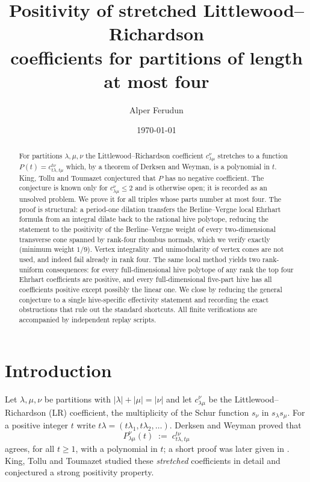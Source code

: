\documentclass[11pt]{amsart}
\title{Positivity of stretched Littlewood--Richardson\\ coefficients for partitions of length at most four}
\author{Alper Ferudun}
\date{\today}
\theoremstyle{definition}
\newcommand{\lam}{\lambda}
\begin{document}
\begin{abstract}
For partitions $\lam,\mu,\nu$ the Littlewood--Richardson coefficient
$c^{\nu}_{\lam\mu}$ stretches to a function $P(t)=c^{t\nu}_{t\lam,t\mu}$ which,
by a theorem of Derksen and Weyman, is a polynomial in $t$. King, Tollu and
Toumazet conjectured that $P$ has no negative coefficient. The conjecture is
known only for $c^{\nu}_{\lam\mu}\le 2$ and is otherwise open; it is recorded
as an unsolved problem. We prove it for all triples whose parts number at most
four. The proof is structural: a period-one dilation transfers the
Berline--Vergne local Ehrhart formula from an integral dilate back to the
rational hive polytope, reducing the statement to the positivity of the
Berline--Vergne weight of every two-dimensional transverse cone spanned by
rank-four rhombus normals, which we verify exactly (minimum weight $1/9$).
Vertex integrality and unimodularity of vertex cones are not used, and indeed
fail already in rank four. The same local method yields two rank-uniform
consequences: for every full-dimensional hive polytope of any rank the top four
Ehrhart coefficients are positive, and every full-dimensional five-part hive has
all coefficients positive except possibly the linear one. We close by reducing
the general conjecture to a single hive-specific effectivity statement and
recording the exact obstructions that rule out the standard shortcuts. All
finite verifications are accompanied by independent replay scripts.
\end{abstract}

\maketitle

\section{Introduction}

Let $\lam,\mu,\nu$ be partitions with $|\lam|+|\mu|=|\nu|$ and let
$c^{\nu}_{\lam\mu}$ be the Littlewood--Richardson (LR) coefficient, the
multiplicity of the Schur function $s_\nu$ in $s_\lam s_\mu$. For a positive
integer $t$ write $t\lam=(t\lam_1,t\lam_2,\dots)$. Derksen and Weyman
\cite{DerksenWeyman} proved that
\[
  P^{\nu}_{\lam\mu}(t)\;:=\;c^{t\nu}_{t\lam,t\mu}
\]
agrees, for all $t\ge 1$, with a polynomial in $t$; a short proof was later
given in \cite{ShortPoly}. King, Tollu and Toumazet \cite{KTT2004,KTT2006}
studied these \emph{stretched} coefficients in detail and conjectured a strong
positivity property.
\end{document}
